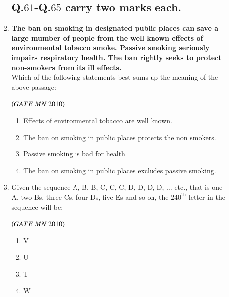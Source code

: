 \documentclass{article}
\begin{document}
\begin{enumerate}[label=Q.\arabic*., itemsep=1em, leftmargin=0pt, itemindent=*, labelsep=0.5em]
\begin{enumerate}[label=Q.\arabic*., start=17, leftmargin=2em]
\begin{enumerate}[label=Q.\arabic*., start=33, leftmargin=2em]
\subsection*{Q.$61$-Q.$65$ carry two marks each.}
\item \textbf{The ban on smoking in designated public places can save a large mumber of people from the
well known effects of environmental tobacco smoke. Passive smoking seriously impairs respiratory health. The ban rightly seeks to protect non-smokers from its ill effects.}\\
Which of the following statements best sums up the meaning of the above passage:
\\
\begin{flushright}
\hfill$\left(GATE\ MN\ 2010\right)$
\end{flushright}
\begin{enumerate}[label=(\Alph*),leftmargin=4em]
\item Effects of environmental tobacco are well known.
\item The ban on smoking in public places protects the non smokers.
\item Passive smoking is bad for health
\item The ban on smoking in public places excludes passive smoking.
\end{enumerate}
\bigskip
\item Given the sequence A, B, B, C, C, C, D, D, D, D, $\ldots$ etc., that is one A, two Bs, three Cs, four Ds, five Es and so on, the $240^{\text{th}}$ letter in the sequence will be:
\\
\begin{flushright}
\hfill$\left(GATE\ MN\ 2010\right)$
\end{flushright}
\begin{multicols}{4}
\begin{enumerate}[label=(\Alph*),leftmargin=4em]
\item V
\item U
\item T
\item W
\end{enumerate}
\end{multicols}


\end{enumerate}
\end{enumerate}
\end{enumerate}
\end{document}
